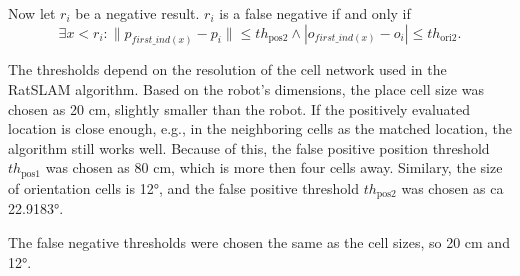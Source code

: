 Now let $r_i$ be a negative result. $r_i$ is a false negative if and only if
$$
    \exists x < r_i:  \| p_{first\_ind(x)} - p_i \| \le th_\text{pos2} \land | o_{first\_ind(x)} - o_i | \le th_{\text{ori2}}.
$$\par
The thresholds depend on the resolution of the cell network used in the RatSLAM algorithm. Based on the robot's dimensions, the place cell size was chosen as 20 cm, slightly smaller than the robot. If the positively evaluated location is close enough, e.g., in the neighboring cells as the matched location, the algorithm still works well. Because of this, the false positive position threshold $th_\text{pos1}$ was chosen as 80 cm, which is more then four cells away. Similary, the size of orientation cells is 12°, and the false positive threshold $th_\text{pos2}$ was chosen as ca 22.9183°.\par
The false negative thresholds were chosen the same as the cell sizes, so 20 cm and 12°.
